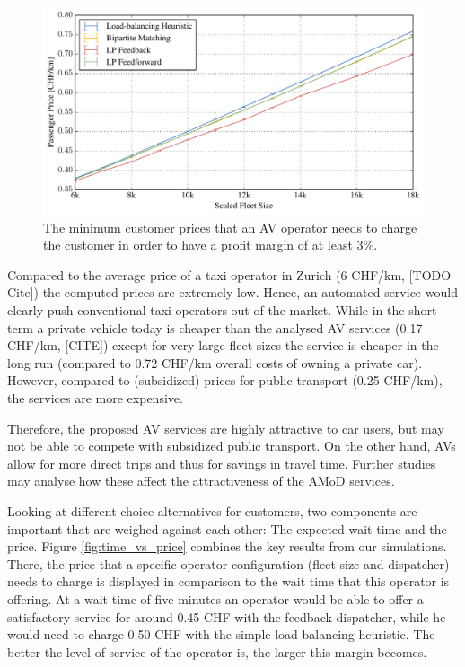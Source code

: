 \begin{figure}
\includegraphics[width=1.0\textwidth]{figures/01_passenger_price.pdf}
\caption{The minimum customer prices that an AV operator needs to charge the customer
in order to have a profit margin of at least 3\%.}
\label{fig:passenger_price}
\end{figure}

Compared to the average price of a taxi operator in Zurich (6 CHF/km, [TODO Cite])
the computed prices are extremely low. Hence, an automated service would clearly
push conventional taxi operators out of the market. While in the short term a
private vehicle today is cheaper than the analysed AV services (0.17 CHF/km, [CITE])
except for very large fleet sizes the service is cheaper in the long run (compared
to 0.72 CHF/km overall costs of owning a private car). However, compared to
(subsidized) prices for public transport (0.25 CHF/km), the services are more
expensive.

Therefore, the proposed AV services are highly attractive to car users, but may
not be able to compete with subsidized public transport. On the other hand, AVs
allow for more direct trips and thus for savings in travel time. Further studies
may analyse how these affect the attractiveness of the AMoD services.

Looking at different choice alternatives for customers, two components are important
that are weighed against each other: The expected wait time and the price. Figure
\ref{fig:time_vs_price} combines the key results from our simulations. There,
the price that a specific operator configuration (fleet size and dispatcher)
needs to charge is
displayed in comparison to the wait time that this operator is offering.
At a wait time of five minutes an operator would be able to offer a satisfactory service
for around 0.45 CHF with the feedback dispatcher, while he would need to charge
0.50 CHF with the simple load-balancing heuristic. The better the level of service
of the operator is, the larger this margin becomes.

